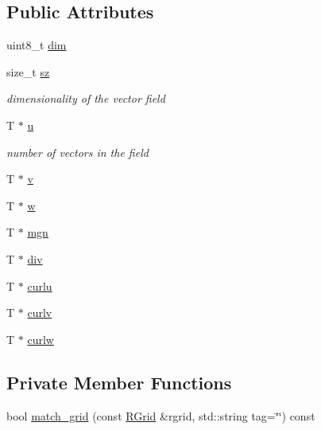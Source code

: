 \subsection*{Public Attributes}
\begin{DoxyCompactItemize}
\item 
uint8\+\_\+t \hyperlink{class_vector_field_aa3d7024cb4d87bc1cb33c44a62e74685}{dim}
\item 
size\+\_\+t \hyperlink{class_vector_field_a23c7ed72d08a14b70ea6193132ad93b8}{sz}
\begin{DoxyCompactList}\small\item\em dimensionality of the vector field \end{DoxyCompactList}\item 
T $\ast$ \hyperlink{class_vector_field_a845073ac9ee0dedbd94ac7b2c79d982d}{u}
\begin{DoxyCompactList}\small\item\em number of vectors in the field \end{DoxyCompactList}\item 
T $\ast$ \hyperlink{class_vector_field_a14e25f68256af61b46828481053c9a74}{v}
\item 
T $\ast$ \hyperlink{class_vector_field_ab0457f5cb47936f2472d76b34c2812e5}{w}
\item 
T $\ast$ \hyperlink{class_vector_field_a107913a4cbfc1601d0be3fad265541ed}{mgn}
\item 
T $\ast$ \hyperlink{class_vector_field_ab413392c6af739bbcd25a9aa6029cdea}{div}
\item 
T $\ast$ \hyperlink{class_vector_field_a0b4a255f9ef92c902fb4f67f0a8da219}{curlu}
\item 
T $\ast$ \hyperlink{class_vector_field_ad870f5b9d757f0a4c8eb8665c9732871}{curlv}
\item 
T $\ast$ \hyperlink{class_vector_field_a4df143789fd195e602b6ef1cb4d9fac1}{curlw}
\end{DoxyCompactItemize}
\subsection*{Private Member Functions}
\begin{DoxyCompactItemize}
\item 
bool \hyperlink{class_vector_field_a3f35d9986bff46b9c6fc39241b26af33}{match\+\_\+grid} (const \hyperlink{struct_r_grid}{R\+Grid} \&rgrid, std\+::string tag=\char`\"{}\char`\"{}) const 
\end{DoxyCompactItemize}


